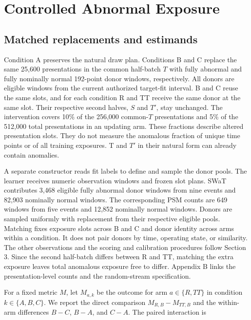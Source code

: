 \documentclass[pdflatex,sn-apa]{sn-jnl}
\begin{document}
\section{Controlled Abnormal
Exposure}\label{controlled-abnormal-exposure}

\subsection{Matched replacements and
estimands}\label{matched-replacements-and-estimands}

Condition A preserves the natural draw plan. Conditions B and C replace
the same 25,600 presentations in the common half-batch \(T\) with fully
abnormal and fully nominally normal 192-point donor windows,
respectively. All donors are eligible windows from the current
authorized target-fit interval. B and C reuse the same slots, and for
each condition R and TT receive the same donor at the same slot. Their
respective second halves, \(S\) and \(T'\), stay unchanged. The
intervention covers 10\% of the 256,000 common-\(T\) presentations and
5\% of the 512,000 total presentations in an updating arm. These
fractions describe altered presentation slots. They do not measure the
anomalous fraction of unique time points or of all training exposures. T
and \(T'\) in their natural form can already contain anomalies.

A separate constructor reads fit labels to define and sample the donor
pools. The learner receives numeric observation windows and frozen slot
plans. SWaT contributes 3,468 eligible fully abnormal donor windows from
nine events and 82,903 nominally normal windows. The corresponding PSM
counts are 649 windows from five events and 12,852 nominally normal
windows. Donors are sampled uniformly with replacement from their
respective eligible pools. Matching fixes exposure slots across B and C
and donor identity across arms within a condition. It does not pair
donors by time, operating state, or similarity. The other observations
and the scoring and calibration procedures follow Section 3. Since the
second half-batch differs between R and TT, matching the extra exposure
leaves total anomalous exposure free to differ. Appendix B links the
presentation-level counts and the random-stream specification.

For a fixed metric \(M\), let \(M_{a,k}\) be the outcome for arm
\(a\in\{R,TT\}\) in condition \(k\in\{A,B,C\}\). We report the direct
comparison \(M_{R,B}-M_{TT,B}\) and the within-arm differences \(B-C\),
\(B-A\), and \(C-A\). The paired interaction is
\end{document}
